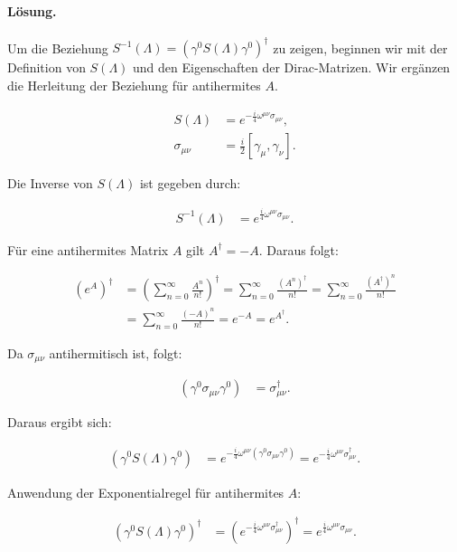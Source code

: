 \documentclass[11pt,a4paper]{article}
\begin{document}
\paragraph{Lösung.}
Um die Beziehung \( S^{-1}(\Lambda) = \left(\gamma^0 S(\Lambda) \gamma^0\right)^{\dagger} \) zu zeigen, beginnen wir mit der Definition von \( S(\Lambda) \) und den Eigenschaften der Dirac-Matrizen. Wir ergänzen die Herleitung der Beziehung für antihermites \( A \).

\begin{align*}
S(\Lambda) &= e^{-\frac{i}{4} \omega^{\mu \nu} \sigma_{\mu \nu}}, \\
\sigma_{\mu \nu} &= \frac{i}{2} [\gamma_\mu, \gamma_\nu].
\end{align*}

Die Inverse von \( S(\Lambda) \) ist gegeben durch:

\begin{align*}
S^{-1}(\Lambda) &= e^{\frac{i}{4} \omega^{\mu \nu} \sigma_{\mu \nu}}.
\end{align*}

Für eine antihermites Matrix \( A \) gilt \( A^{\dagger} = -A \). Daraus folgt:

\begin{align*}
(e^A)^{\dagger} &= \left(\sum_{n=0}^{\infty} \frac{A^n}{n!}\right)^{\dagger} = \sum_{n=0}^{\infty} \frac{(A^n)^{\dagger}}{n!} = \sum_{n=0}^{\infty} \frac{(A^{\dagger})^n}{n!} \\
&= \sum_{n=0}^{\infty} \frac{(-A)^n}{n!} = e^{-A} = e^{A^{\dagger}}.
\end{align*}

Da \( \sigma_{\mu \nu} \) antihermitisch ist, folgt:

\begin{align*}
(\gamma^0 \sigma_{\mu \nu} \gamma^0) &= \sigma_{\mu \nu}^\dagger.
\end{align*}

Daraus ergibt sich:

\begin{align*}
\left(\gamma^0 S(\Lambda) \gamma^0\right) &= e^{-\frac{i}{4} \omega^{\mu \nu} (\gamma^0 \sigma_{\mu \nu} \gamma^0)} = e^{-\frac{i}{4} \omega^{\mu \nu} \sigma_{\mu \nu}^\dagger}.
\end{align*}

Anwendung der Exponentialregel für antihermites \( A \):

\begin{align*}
\left(\gamma^0 S(\Lambda) \gamma^0\right)^{\dagger} &= \left(e^{-\frac{i}{4} \omega^{\mu \nu} \sigma_{\mu \nu}^\dagger}\right)^{\dagger} = e^{\frac{i}{4} \omega^{\mu \nu} \sigma_{\mu \nu}}.
\end{align*}
\end{document}
